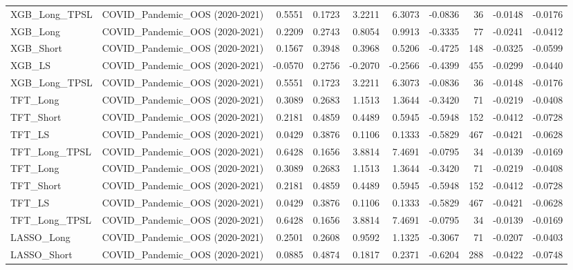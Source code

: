 \begin{tabular}{llrrrrrrrr}
\cline{1-10}
XGB\_Long\_TPSL & COVID\_Pandemic\_OOS (2020-2021) & 0.5551 & 0.1723 & 3.2211 & 6.3073 & -0.0836 & 36 & -0.0148 & -0.0176 \\
\cline{1-10}
XGB\_Long & COVID\_Pandemic\_OOS (2020-2021) & 0.2209 & 0.2743 & 0.8054 & 0.9913 & -0.3335 & 77 & -0.0241 & -0.0412 \\
\cline{1-10}
XGB\_Short & COVID\_Pandemic\_OOS (2020-2021) & 0.1567 & 0.3948 & 0.3968 & 0.5206 & -0.4725 & 148 & -0.0325 & -0.0599 \\
\cline{1-10}
XGB\_LS & COVID\_Pandemic\_OOS (2020-2021) & -0.0570 & 0.2756 & -0.2070 & -0.2566 & -0.4399 & 455 & -0.0299 & -0.0440 \\
\cline{1-10}
XGB\_Long\_TPSL & COVID\_Pandemic\_OOS (2020-2021) & 0.5551 & 0.1723 & 3.2211 & 6.3073 & -0.0836 & 36 & -0.0148 & -0.0176 \\
\cline{1-10}
TFT\_Long & COVID\_Pandemic\_OOS (2020-2021) & 0.3089 & 0.2683 & 1.1513 & 1.3644 & -0.3420 & 71 & -0.0219 & -0.0408 \\
\cline{1-10}
TFT\_Short & COVID\_Pandemic\_OOS (2020-2021) & 0.2181 & 0.4859 & 0.4489 & 0.5945 & -0.5948 & 152 & -0.0412 & -0.0728 \\
\cline{1-10}
TFT\_LS & COVID\_Pandemic\_OOS (2020-2021) & 0.0429 & 0.3876 & 0.1106 & 0.1333 & -0.5829 & 467 & -0.0421 & -0.0628 \\
\cline{1-10}
TFT\_Long\_TPSL & COVID\_Pandemic\_OOS (2020-2021) & 0.6428 & 0.1656 & 3.8814 & 7.4691 & -0.0795 & 34 & -0.0139 & -0.0169 \\
\cline{1-10}
TFT\_Long & COVID\_Pandemic\_OOS (2020-2021) & 0.3089 & 0.2683 & 1.1513 & 1.3644 & -0.3420 & 71 & -0.0219 & -0.0408 \\
\cline{1-10}
TFT\_Short & COVID\_Pandemic\_OOS (2020-2021) & 0.2181 & 0.4859 & 0.4489 & 0.5945 & -0.5948 & 152 & -0.0412 & -0.0728 \\
\cline{1-10}
TFT\_LS & COVID\_Pandemic\_OOS (2020-2021) & 0.0429 & 0.3876 & 0.1106 & 0.1333 & -0.5829 & 467 & -0.0421 & -0.0628 \\
\cline{1-10}
TFT\_Long\_TPSL & COVID\_Pandemic\_OOS (2020-2021) & 0.6428 & 0.1656 & 3.8814 & 7.4691 & -0.0795 & 34 & -0.0139 & -0.0169 \\
\cline{1-10}
LASSO\_Long & COVID\_Pandemic\_OOS (2020-2021) & 0.2501 & 0.2608 & 0.9592 & 1.1325 & -0.3067 & 71 & -0.0207 & -0.0403 \\
\cline{1-10}
LASSO\_Short & COVID\_Pandemic\_OOS (2020-2021) & 0.0885 & 0.4874 & 0.1817 & 0.2371 & -0.6204 & 288 & -0.0422 & -0.0748 \\

\end{tabular}
